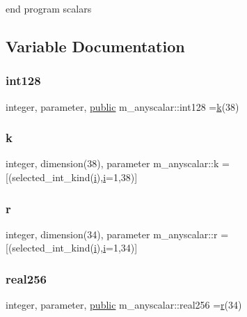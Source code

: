 end program scalars 

\subsection{Variable Documentation}
\mbox{\label{namespacem__anyscalar_a53057899b7d17505b79d9b8f5e6092a2}} 
\subsubsection{\texorpdfstring{int128}{int128}}
{\footnotesize\ttfamily integer, parameter, \hyperlink{M__stopwatch_83_8txt_a2f74811300c361e53b430611a7d1769f}{public} m\+\_\+anyscalar\+::int128 =\hyperlink{namespacem__anyscalar_a099da1dd8639cdce3d0f5bb3cb8fbd03}{k}(38)}

\mbox{\label{namespacem__anyscalar_a099da1dd8639cdce3d0f5bb3cb8fbd03}} 
\subsubsection{\texorpdfstring{k}{k}}
{\footnotesize\ttfamily integer, dimension(38), parameter m\+\_\+anyscalar\+::k =\mbox{[}(selected\+\_\+int\+\_\+kind(\hyperlink{intro__blas1_83_8txt_a8ba82a50c0c2c12d5f6a77f7e4651c0b}{i}),\hyperlink{intro__blas1_83_8txt_a8ba82a50c0c2c12d5f6a77f7e4651c0b}{i}=1,38)\mbox{]}\hspace{0.3cm}{\ttfamily [private]}}

\mbox{\label{namespacem__anyscalar_af515907c09cc2ac286a4523cc73f5f52}} 
\subsubsection{\texorpdfstring{r}{r}}
{\footnotesize\ttfamily integer, dimension(34), parameter m\+\_\+anyscalar\+::r =\mbox{[}(selected\+\_\+int\+\_\+kind(\hyperlink{intro__blas1_83_8txt_a8ba82a50c0c2c12d5f6a77f7e4651c0b}{i}),\hyperlink{intro__blas1_83_8txt_a8ba82a50c0c2c12d5f6a77f7e4651c0b}{i}=1,34)\mbox{]}\hspace{0.3cm}{\ttfamily [private]}}

\mbox{\label{namespacem__anyscalar_a6d3ef2bc1698c91d737dbd8824a9eb0b}} 
\subsubsection{\texorpdfstring{real256}{real256}}
{\footnotesize\ttfamily integer, parameter, \hyperlink{M__stopwatch_83_8txt_a2f74811300c361e53b430611a7d1769f}{public} m\+\_\+anyscalar\+::real256 =\hyperlink{namespacem__anyscalar_af515907c09cc2ac286a4523cc73f5f52}{r}(34)}

